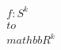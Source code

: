 \documentclass[preview]{standalone}
\begin{document}
\begin{align*}
f: S^k \\to \\mathbb{R}^k
\end{align*}
\end{document}
